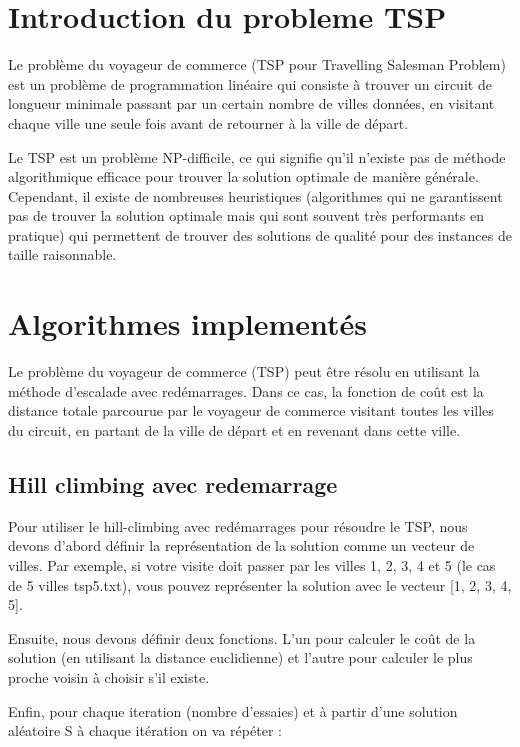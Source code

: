 \documentclass[12pt]{article}
\begin{document}
    \newpage
        \tableofcontents
    \newpage
        \section{Introduction du probleme TSP}
        Le problème du voyageur de commerce (TSP pour Travelling Salesman Problem) est un problème de programmation linéaire qui consiste à trouver un circuit de longueur minimale passant par un certain nombre de villes données, en visitant chaque ville une seule fois avant de retourner à la ville de départ.

        Le TSP est un problème NP-difficile, ce qui signifie qu'il n'existe pas de méthode algorithmique efficace pour trouver la solution optimale de manière générale. Cependant, il existe de nombreuses heuristiques (algorithmes qui ne garantissent pas de trouver la solution optimale mais qui sont souvent très performants en pratique) qui permettent de trouver des solutions de qualité pour des instances de taille raisonnable.
        \section{Algorithmes implementés}
                Le problème du voyageur de commerce (TSP) peut être résolu en utilisant la méthode d'escalade avec redémarrages. Dans ce cas, la fonction de coût est la distance totale parcourue par le voyageur de commerce visitant toutes les villes du circuit, en partant de la ville de départ et en revenant dans cette ville.

            \subsection{Hill climbing avec redemarrage}
                Pour utiliser le hill-climbing avec redémarrages pour résoudre le TSP, nous devons d'abord définir la représentation de la solution comme un vecteur de villes. Par exemple, si votre visite doit passer par les villes 1, 2, 3, 4 et 5 (le cas de 5 villes tsp5.txt), vous pouvez représenter la solution avec le vecteur [1, 2, 3, 4, 5].

                Ensuite, nous devons définir deux fonctions. L'un pour calculer le coût de la solution (en utilisant la distance euclidienne) et l'autre pour calculer le plus proche voisin à choisir s'il existe.

                Enfin, pour chaque iteration (nombre d'essaies) et à partir d'une solution aléatoire S à chaque itération on va répéter :
\end{document}
